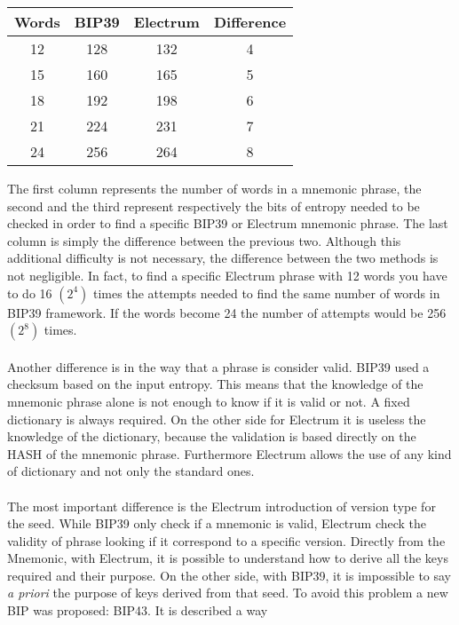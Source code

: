 \begin{center}
	\begin{tabular}{|| c | c | c | c ||} 
		\hline
		Words & BIP39 & Electrum & Difference \\ [0.5ex] 
		\hline\hline
		12 & 128 & 132 & 4 \\ 
		
		15 & 160 & 165 & 5 \\
		
		18 & 192 & 198 & 6 \\
		
		21 & 224 & 231 & 7 \\
		
		24 & 256 & 264 & 8 \\ 
		\hline
	\end{tabular}
\end{center}
The first column represents the number of words in a mnemonic phrase, the second and the third represent respectively the bits of entropy needed to be checked in order to find a specific BIP39 or Electrum mnemonic phrase. The last column is simply the difference between the previous two. Although this additional difficulty is not necessary, the difference between the two methods is not negligible. In fact, to find a specific Electrum phrase with 12 words you have to do 16 $(2^4)$ times the attempts needed to find the same number of words in BIP39 framework. If the words become 24 the number of attempts would be 256 $(2^8)$ times.
\\ \\ 
Another difference is in the way that a phrase is consider valid. BIP39 used a checksum based on the input entropy. This means that the knowledge of the mnemonic phrase alone is not enough to know if it is valid or not. A fixed dictionary is always required. On the other side for Electrum it is useless the knowledge of the dictionary, because the validation is based directly on the HASH of the mnemonic phrase. Furthermore Electrum allows the use of any kind of dictionary and not only the standard ones.
\\ \\
The most important difference is the Electrum introduction of version type for the seed. While BIP39 only check if a mnemonic is valid, Electrum check the validity of phrase looking if it correspond to a specific version. Directly from the Mnemonic, with Electrum, it is possible to understand how to derive all the keys required and their purpose. On the other side, with BIP39, it is impossible to say \textit{a priori} the purpose of keys derived from that seed. To avoid this problem a new BIP was proposed: BIP43. It is described a way 








